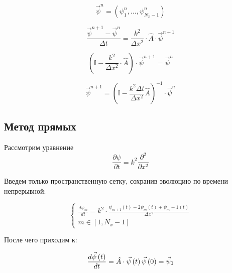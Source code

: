 \documentclass[10pt,a4paper]{article}
\begin{document}
		\begin{equation}
			\vec{\psi}^{n} = \left(\psi_{1}^{n}, \ldots, \psi_{N_{x} - 1}^{n}
			\right)
		\end{equation}
		
		\begin{equation}
			\frac{\vec{\psi}^{n + 1} - \vec{\psi}^{n}}{\Delta t} = 
			\frac{k^{2}}{\Delta x^{2}}\cdot\hat{A}\cdot\vec{\psi}^{n + 1}
		\end{equation}
		
		\begin{equation}
			\left(\mathbb{I} - \frac{k^{2}}{\Delta x^{2}}\cdot\hat{A}\right)
			\cdot\vec{\psi}^{n + 1} = \vec{\psi}^{n}
		\end{equation}
		
		\begin{equation}
			\vec{\psi}^{n + 1} = \left(\mathbb{I} - \frac{k^{2}\Delta t}{\Delta 
			x^{2}}\hat{A}\right)^{-1}\cdot\vec{\psi}^{n}
		\end{equation}
		
	\subsection{Метод прямых}
		
		Рассмотрим уравнение
		\begin{equation}
			\frac{\partial \psi}{\partial t} = k^{2}\frac{\partial^{2}}
			{\partial x^{2}}
		\end{equation}
		
		Введем только пространственную сетку, сохранив эволюцию по времени 
		непрерывной:
		
		\begin{equation}
			\begin{cases}
				\frac{d \psi_{m}}{dt} = k^{2}\cdot\frac{\psi_{m + 1}\left(t
				\right) - 2\psi_{m}\left(t\right) + \psi_{m} - 1\left(t\right)}
				{\Delta x^{2}}
				\\
				m \in \left[1, N_{x} - 1\right] 
			\end{cases}
		\end{equation}
		
		После чего приходим к: 
		
		\begin{equation}
			\frac{d\vec{\psi}\left(t\right)}{dt} = \hat{A}\cdot\vec{\psi}\left(t
			\right)
			\\
			\vec{\psi}\left(0\right) = \vec{\psi}_{0}
		\end{equation}
		
\end{document}

